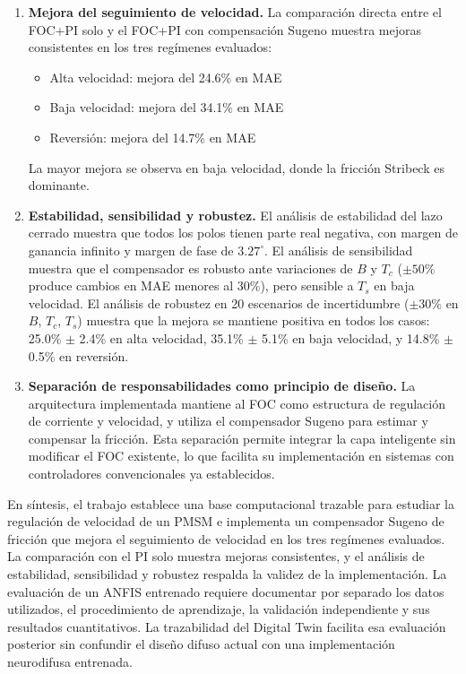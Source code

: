 \begin{enumerate}
\item \textbf{Mejora del seguimiento de velocidad.} La comparación directa entre el FOC+PI solo y el FOC+PI con compensación Sugeno muestra mejoras consistentes en los tres regímenes evaluados:
\begin{itemize}
\item Alta velocidad: mejora del 24.6\% en MAE
\item Baja velocidad: mejora del 34.1\% en MAE
\item Reversión: mejora del 14.7\% en MAE
\end{itemize}
La mayor mejora se observa en baja velocidad, donde la fricción Stribeck es dominante.

\item \textbf{Estabilidad, sensibilidad y robustez.} El análisis de estabilidad del lazo cerrado muestra que todos los polos tienen parte real negativa, con margen de ganancia infinito y margen de fase de $3.27^\circ$. El análisis de sensibilidad muestra que el compensador es robusto ante variaciones de $B$ y $T_c$ ($\pm 50\%$ produce cambios en MAE menores al 30\%), pero sensible a $T_s$ en baja velocidad. El análisis de robustez en 20 escenarios de incertidumbre ($\pm 30\%$ en $B$, $T_c$, $T_s$) muestra que la mejora se mantiene positiva en todos los casos: 25.0\% $\pm$ 2.4\% en alta velocidad, 35.1\% $\pm$ 5.1\% en baja velocidad, y 14.8\% $\pm$ 0.5\% en reversión.

\item \textbf{Separación de responsabilidades como principio de diseño.} La arquitectura implementada mantiene al FOC como estructura de regulación de corriente y velocidad, y utiliza el compensador Sugeno para estimar y compensar la fricción. Esta separación permite integrar la capa inteligente sin modificar el FOC existente, lo que facilita su implementación en sistemas con controladores convencionales ya establecidos.

\end{enumerate}

En síntesis, el trabajo establece una base computacional trazable para estudiar la regulación de velocidad de un PMSM e implementa un compensador Sugeno de fricción que mejora el seguimiento de velocidad en los tres regímenes evaluados. La comparación con el PI solo muestra mejoras consistentes, y el análisis de estabilidad, sensibilidad y robustez respalda la validez de la implementación. La evaluación de un ANFIS entrenado requiere documentar por separado los datos utilizados, el procedimiento de aprendizaje, la validación independiente y sus resultados cuantitativos. La trazabilidad del Digital Twin facilita esa evaluación posterior sin confundir el diseño difuso actual con una implementación neurodifusa entrenada.
